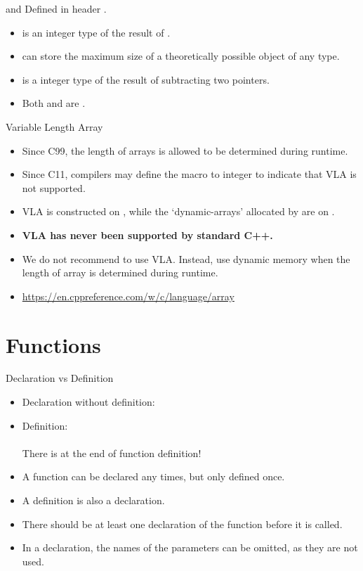 \documentclass{beamer}
\begin{document}
\begin{frame}{ and }
	Defined in header .
	\begin{itemize}
		\item {} is an  integer type of the result of .
		\item {} can store the maximum size of a theoretically possible object of any type.
		\item {} is a  integer type of the result of subtracting two pointers.
		\item Both  and  are .
	\end{itemize}
\end{frame}

\begin{frame}{Variable Length Array}
	\begin{itemize}
		\item Since C99, the length of arrays is allowed to be determined during runtime.
		\item Since C11, compilers may define the macro  to integer  to indicate that VLA is not supported.
		\item VLA is constructed on , while the `dynamic-arrays' allocated by  are on .
		\pause
		\item \textbf{VLA has never been supported by standard C++.}
		\item We do not recommend to use VLA. Instead, use dynamic memory when the length of array is determined during runtime.
		\item \url{https://en.cppreference.com/w/c/language/array}
	\end{itemize}
\end{frame}

\section{Functions}

\begin{frame}{Declaration vs Definition}
	\begin{itemize}
		\item Declaration without definition:\\
		\item Definition:\\
		\\
		There is  at the end of function definition!
		\pause
		\item A function can be declared any times, but only defined once.
		\item A definition is also a declaration.
		\item There should be at least one declaration of the function before it is called.
		\item In a declaration, the names of the parameters can be omitted, as they are not used.
	\end{itemize}
\end{frame}
\end{document}
